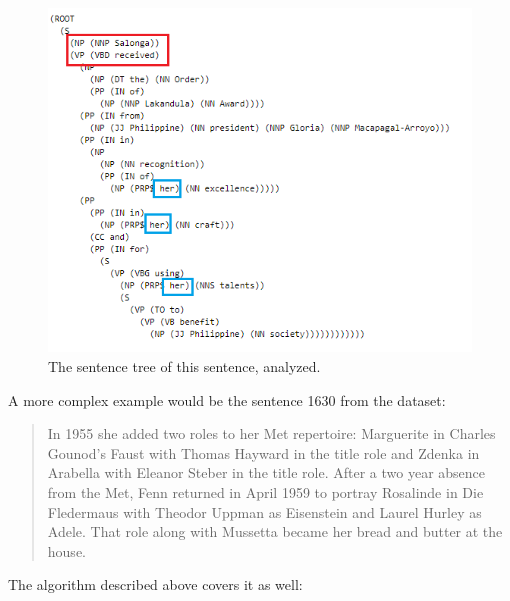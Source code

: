 \documentclass{article}
\begin{document}
\begin{figure}[H]
    \centering
\includegraphics[width=\textwidth]{Example1.png}
    \caption{The sentence tree of this sentence, analyzed.}
\end{figure}
\noindent A more complex example would be the sentence 1630 from the dataset:
\begin{quote}
    In 1955 she added two roles to her Met repertoire: Marguerite in Charles Gounod's Faust with Thomas Hayward in the title role and Zdenka in Arabella with Eleanor Steber in the title role. After a two year absence from the Met, Fenn returned in April 1959 to portray Rosalinde in Die Fledermaus with Theodor Uppman as Eisenstein and Laurel Hurley as Adele. That role along with Mussetta became her bread and butter at the house.
\end{quote}
The algorithm described above covers it as well:
\end{document}

